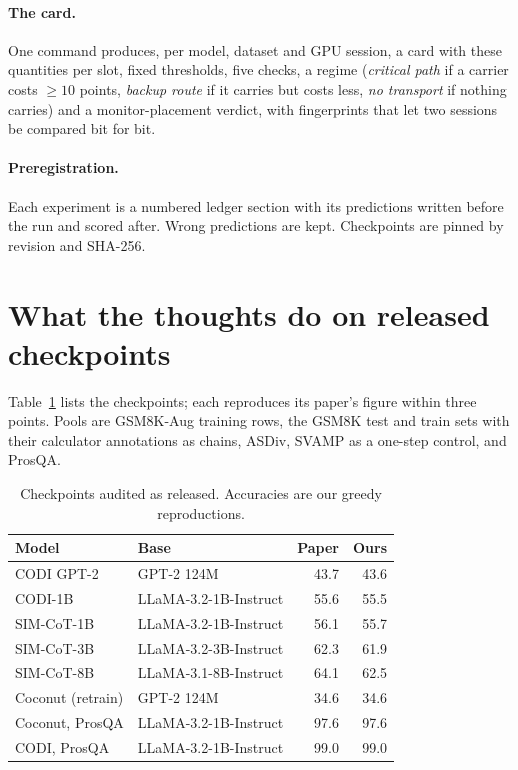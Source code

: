 \documentclass{article}
\begin{document}
\paragraph{The card.} One command produces, per model, dataset and GPU session, a card with these quantities per slot, fixed thresholds, five checks, a regime (\emph{critical path} if a carrier costs $\ge 10$ points, \emph{backup route} if it carries but costs less, \emph{no transport} if nothing carries) and a monitor-placement verdict, with fingerprints that let two sessions be compared bit for bit.

\paragraph{Preregistration.} Each experiment is a numbered ledger section with its predictions written before the run and scored after. Wrong predictions are kept. Checkpoints are pinned by revision and SHA-256.

\section{What the thoughts do on released checkpoints}\label{sec:released}

Table~\ref{tab:models} lists the checkpoints; each reproduces its paper's figure within three points. Pools are GSM8K-Aug training rows, the GSM8K test and train sets with their calculator annotations as chains, ASDiv, SVAMP as a one-step control, and ProsQA.

\begin{table}[h]
\caption{Checkpoints audited as released. Accuracies are our greedy reproductions.}
\label{tab:models}
\centering\small
\begin{tabular}{llrr}
\toprule
Model & Base & Paper & Ours \\
\midrule
CODI GPT-2 & GPT-2 124M & 43.7 & 43.6 \\
CODI-1B & LLaMA-3.2-1B-Instruct & 55.6 & 55.5 \\
SIM-CoT-1B & LLaMA-3.2-1B-Instruct & 56.1 & 55.7 \\
SIM-CoT-3B & LLaMA-3.2-3B-Instruct & 62.3 & 61.9 \\
SIM-CoT-8B & LLaMA-3.1-8B-Instruct & 64.1 & 62.5 \\
Coconut (retrain) & GPT-2 124M & 34.6 & 34.6 \\
Coconut, ProsQA & LLaMA-3.2-1B-Instruct & 97.6 & 97.6 \\
CODI, ProsQA & LLaMA-3.2-1B-Instruct & 99.0 & 99.0 \\
\bottomrule
\end{tabular}
\end{table}
\end{document}
